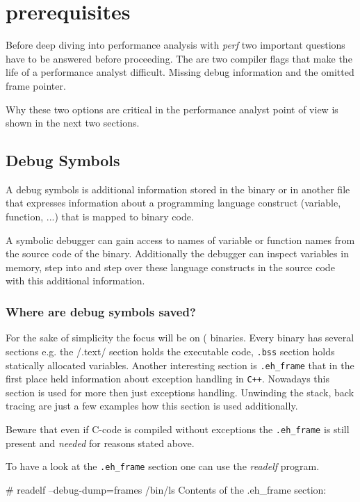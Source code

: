 \section{prerequisites}
Before deep diving into performance analysis with {\em perf} two important
questions have to be answered before proceeding. The are two compiler
flags that make the life of a performance analyst difficult. Missing
debug information and the omitted frame pointer.

Why these two options are critical in the performance analyst point of
view is shown in the next two sections.

\subsection{Debug Symbols}

A debug symbols is additional information stored in the binary or in
another file that expresses information about a programming language
construct (variable, function, ...) that is mapped to binary code.

A symbolic debugger can gain access to names of variable or function
names from the source code of the binary. Additionally the debugger
can inspect variables in memory, step into and step over these
language constructs in the source code with this additional
information.

\subsubsection{Where are debug symbols saved?}

For the sake of simplicity the focus will be on  (\ELF\)
binaries. Every binary has several sections e.g. the /.text/ section
holds the executable code, {\tt .bss} section holds statically
allocated variables. Another interesting section is {\tt .eh_frame}
that in the first place held information about exception handling in
{\tt C++}.  Nowadays this section is used for more then just
exceptions handling. Unwinding the stack, back tracing are just a few
examples how this section is used additionally.

Beware that even if C-code is compiled without exceptions the
{\tt .eh_frame} is still present and {\em needed} for reasons stated above.

To have a look at the {\tt .eh_frame} section one can use the {\em readelf}
program.

\starttyping
# readelf --debug-dump=frames /bin/ls
Contents of the .eh_frame section:

